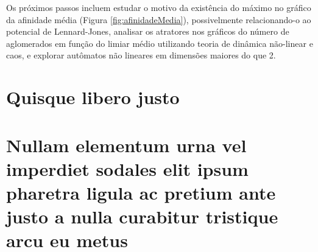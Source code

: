 \documentclass[
	12pt,				%
	openright,			%
	twoside,			%
	a4paper,			%
	english,			%
	french,				%
	spanish,			%
	brazil				%
	]{abntex2}
\begin{document}
Os próximos passos incluem estudar o motivo da existência do máximo no gráfico da afinidade média (Figura \ref{fig:afinidadeMedia}), possivelmente relacionando-o ao potencial de Lennard-Jones, analisar os atratores nos gráficos do número de aglomerados em função do limiar médio utilizando teoria de dinâmica não-linear e caos, e explorar autômatos não lineares em dimensões maiores do que 2.

\postextual



%
%


\begin{apendicesenv}

\partapendices

\chapter{Quisque libero justo}

\lipsum[50]

\chapter{Nullam elementum urna vel imperdiet sodales elit ipsum pharetra ligula
ac pretium ante justo a nulla curabitur tristique arcu eu metus}
\lipsum[55-57]

\end{apendicesenv}
\end{document}
